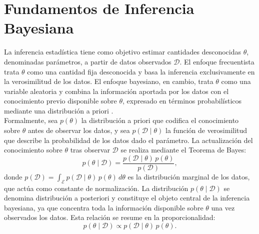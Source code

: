 \section{Fundamentos de Inferencia Bayesiana}
\label{02_03_00_inferencia_bayesiana}

La inferencia estadística tiene como objetivo estimar cantidades desconocidas $\theta$, denominadas parámetros, a partir de datos observados $\mathcal{D}$. El enfoque frecuentista trata $\theta$ como una cantidad fija desconocida y basa la inferencia exclusivamente en la verosimilitud de los datos. El enfoque bayesiano, en cambio, trata $\theta$ como una variable aleatoria y combina la información aportada por los datos con el conocimiento previo disponible sobre $\theta$, expresado en términos probabilísticos mediante una distribución a priori \citep{02_03_bayes1763essay}.\\

Formalmente, sea $p(\theta)$ la distribución a priori que codifica el conocimiento sobre $\theta$ antes de observar los datos, y sea $p(\mathcal{D} \mid \theta)$ la función de verosimilitud que describe la probabilidad de los datos dado el parámetro. La actualización del conocimiento sobre $\theta$ tras observar $\mathcal{D}$ se realiza mediante el Teorema de Bayes:
\begin{equation}
    p(\theta \mid \mathcal{D}) = \frac{p(\mathcal{D} \mid \theta)\, p(\theta)}{p(\mathcal{D})},
\end{equation}
donde $p(\mathcal{D}) = \int_{\mathcal{E}} p(\mathcal{D} \mid \theta)\, p(\theta)\, d\theta$ es la distribución marginal de los datos, que actúa como constante de normalización. La distribución $p(\theta \mid \mathcal{D})$ se denomina distribución a posteriori y constituye el objeto central de la inferencia bayesiana, ya que concentra toda la información disponible sobre $\theta$ una vez observados los datos. Esta relación se resume en la proporcionalidad:
\begin{equation}
    p(\theta \mid \mathcal{D}) \propto p(\mathcal{D} \mid \theta)\, p(\theta).
\end{equation}

